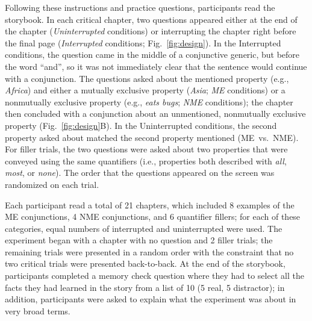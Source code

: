 \documentclass[10pt,letterpaper]{article}
\newcommand{\red}[1]{{\textcolor{Red}{#1}}}
\begin{document}
Following these instructions and practice questions, participants read the storybook.
In each critical chapter, two questions appeared either at the end of the chapter (\emph{Uninterrupted} conditions) or interrupting the chapter right before the final page  (\emph{Interrupted} conditions; Fig.~\ref{fig:design}).
In the Interrupted conditions, the question came in the middle of a conjunctive generic, but before the word ``and'', so it was not immediately clear that the sentence would continue with a conjunction.
The questions asked about the mentioned property (e.g., \emph{Africa}) and either a mutually exclusive property (\emph{Asia}; \emph{ME} conditions) or a nonmutually exclusive property (e.g., \emph{eats bugs}; \emph{NME} conditions); the chapter then concluded with a conjunction about an unmentioned, nonmutually exclusive property (Fig.~\ref{fig:design}B).
In the Uninterrupted conditions,  the second property asked about matched the second property mentioned (ME~vs.~NME). 
For filler trials, the two questions were asked about two properties that were conveyed using the same quantifiers (i.e., properties both described with \emph{all}, \emph{most}, or \emph{none}).
The order that the questions appeared on the screen was randomized on each trial.

Each participant read a total of 21 chapters, which included 8 examples of the ME conjunctions, 4 NME conjunctions, and 6 quantifier fillers; for each of these categories, equal numbers of interrupted and uninterrupted were used. 
The experiment began with a chapter with no question and 2 filler trials; the remaining trials were presented in a random order with the constraint that no two critical trials were presented back-to-back. 
At the end of the storybook, participants completed a memory check question where they had to select all the facts they had learned in the story from a list of 10 (5 real, 5 distractor); in addition, participants were asked to explain what the experiment was about in very broad terms.

\end{document}
